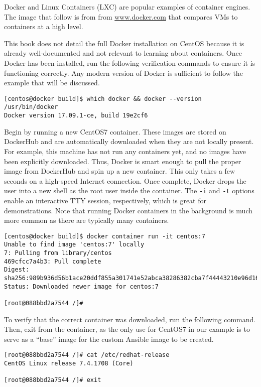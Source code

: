 Docker and Linux Containers (LXC) are popular examples of container engines.
The image that follow is from from \url{www.docker.com} that compares VMs to
containers at a high
level.


This book does not detail the full Docker installation on CentOS because it is
already well-documented and not relevant to learning about containers. Once
Docker has been installed, run the following verification commands to ensure
it is functioning correctly. Any modern version of Docker is sufficient to
follow the example that will be discussed.

\begin{verbatim}
[centos@docker build]$ which docker && docker --version
/usr/bin/docker
Docker version 17.09.1-ce, build 19e2cf6
\end{verbatim}


Begin by running a new CentOS7 container. These images are stored on DockerHub
and are automatically downloaded when they are not locally present. For
example, this machine has not run any containers yet, and no images have been
explicitly downloaded. Thus, Docker is smart enough to pull the proper image
from DockerHub and spin up a new container. This only takes a few seconds on a
high-speed Internet connection. Once complete, Docker drops the user into a
new shell as the root user inside the container. The \verb|-i| and \verb|-t|
options enable an interactive TTY session, respectively, which is great for
demonstrations.  Note that running Docker containers in the background is much
more common as there are typically many containers.

\begin{verbatim}
[centos@docker build]$ docker container run -it centos:7
Unable to find image 'centos:7' locally
7: Pulling from library/centos
469cfcc7a4b3: Pull complete 
Digest: sha256:989b936d56b1ace20ddf855a301741e52abca38286382cba7f44443210e96d16
Status: Downloaded newer image for centos:7

[root@088bbd2a7544 /]# 
\end{verbatim}

To verify that the correct container was downloaded, run the following
command. Then, exit from the container, as the only use for CentOS7 in our
example is to serve as a ``base'' image for the custom Ansible image to be
created.

\begin{verbatim}
[root@088bbd2a7544 /]# cat /etc/redhat-release 
CentOS Linux release 7.4.1708 (Core) 

[root@088bbd2a7544 /]# exit
\end{verbatim}

